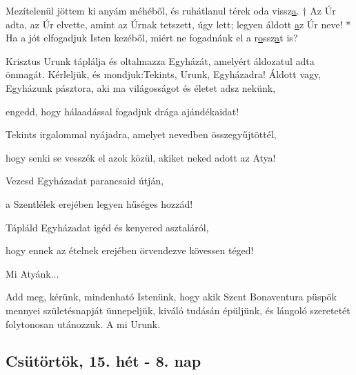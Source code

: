 \documentclass[twoside]{article}
\begin{document}
Mezítelenül jöttem ki anyám méhéből, és ruhátlanul térek oda vissz\underline{a}. † Az Úr adta, az Úr elvette, amint az Úrnak tetszett, úgy lett; legyen áldott \underline{a}z Úr neve! * Ha a jót elfogadjuk Isten kezéből, miért ne fogadnánk el a r\underline{o}ssz\underline{a}t is?







\begin{preces}{Krisztus Urunk táplálja és oltalmazza Egyházát, amelyért áldozatul adta önmagát. Kérleljük, és mondjuk:}{Tekints, Urunk, Egyházadra!}
  Áldott vagy, Egyházunk pásztora, aki ma világosságot és életet adsz nekünk,

  \reddash engedd, hogy hálaadással fogadjuk drága ajándékaidat!

  Tekints irgalommal nyájadra, amelyet nevedben összegyűjtöttél,

  \reddash hogy senki se vesszék el azok közül, akiket neked adott az Atya!

  Vezesd Egyházadat parancsaid útján,

  \reddash a Szentlélek erejében legyen hűséges hozzád!

  Tápláld Egyházadat igéd és kenyered asztaláról,

  \reddash hogy ennek az ételnek erejében örvendezve kövessen téged!
\end{preces}
Mi Atyánk...

Add meg, kérünk, mindenható Istenünk, hogy akik Szent Bonaventura püspök mennyei születésnapját ünnepeljük, kiváló tudásán épüljünk, és lángoló szeretetét folytonosan utánozzuk. A mi Urunk.


\subsection*{Csütörtök, 15. hét - 8. nap}

\end{document}
